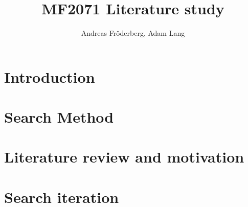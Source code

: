 \documentclass[a4paper, 12pt]{article}
\title{MF2071 Literature study}
\author{Andreas Fr\"{o}derberg, Adam Lang}
\begin{document}
\maketitle
\pagebreak
\section*{Introduction}




\section*{Search Method}


\section*{Literature review and motivation}


\pagebreak
\section*{Search iteration}


\pagebreak


\end{document}
